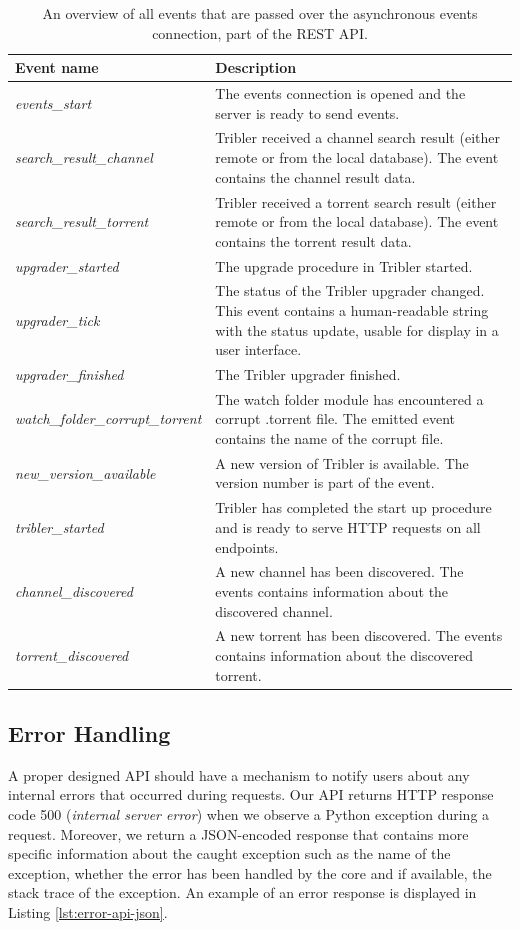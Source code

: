 \begin{table}
	\begin{tabularx}{\textwidth}{|l|X|}
		\hline
		\textbf{Event name} & \textbf{Description} \\ \hline
		\emph{events\_start} & The events connection is opened and the server is ready to send events.  \\ \hline
		\emph{search\_result\_channel} & Tribler received a channel search result (either remote or from the local database). The event contains the channel result data. \\ \hline
		\emph{search\_result\_torrent} & Tribler received a torrent search result (either remote or from the local database). The event contains the torrent result data. \\ \hline
		\emph{upgrader\_started} & The upgrade procedure in Tribler started. \\ \hline
		\emph{upgrader\_tick} & The status of the Tribler upgrader changed. This event contains a human-readable string with the status update, usable for display in a user interface. \\ \hline
		\emph{upgrader\_finished} & The Tribler upgrader finished. \\ \hline
		\emph{watch\_folder\_corrupt\_torrent} & The watch folder module has encountered a corrupt .torrent file. The emitted event contains the name of the corrupt file.\\ \hline
		\emph{new\_version\_available} & A new version of Tribler is available. The version number is part of the event.\\ \hline
		\emph{tribler\_started} & Tribler has completed the start up procedure and is ready to serve HTTP requests on all endpoints.\\ \hline
		\emph{channel\_discovered} & A new channel has been discovered. The events contains information about the discovered channel.\\ \hline
		\emph{torrent\_discovered} & A new torrent has been discovered. The events contains information about the discovered torrent.\\ \hline
	\end{tabularx}
	\caption{An overview of all events that are passed over the asynchronous events connection, part of the REST API.}
	\label{table:rest-api-events}
\end{table}

\subsection{Error Handling}
\label{subsec:error-handling-api}
A proper designed API should have a mechanism to notify users about any internal errors that occurred during requests. Our API returns HTTP response code 500 (\emph{internal server error}) when we observe a Python exception during a request. Moreover, we return a JSON-encoded response that contains more specific information about the caught exception such as the name of the exception, whether the error has been handled by the core and if available, the stack trace of the exception. An example of an error response is displayed in Listing \ref{lst:error-api-json}.

